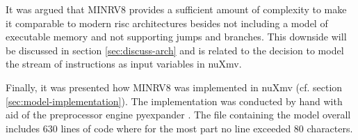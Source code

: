 It was argued that MINRV8 provides a sufficient amount of complexity to make it comparable to modern \gls{risc} architectures besides not including a model of executable memory and not supporting jumps and branches.
This downside will be discussed in section \ref{sec:discuss-arch} and is related to the decision to model the stream of instructions as input variables in nuXmv.

Finally, it was presented how MINRV8 was implemented in nuXmv (cf. section \ref{sec:model-implementation}).
The implementation was conducted by hand with aid of the preprocessor engine pyexpander \cite{pyexpander}.
The file containing the model overall includes 630 lines of code where for the most part no line exceeded 80 characters.
